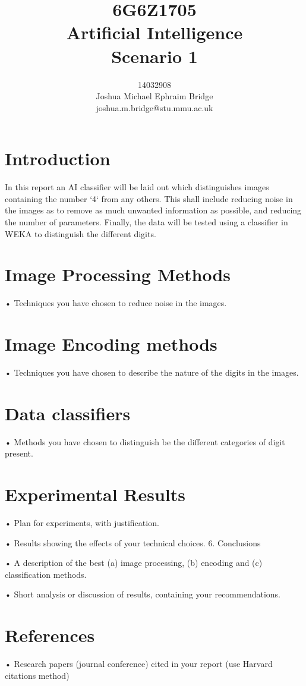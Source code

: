 \documentclass[12pt]{article}
\title{\vspace{2cm}6G6Z1705\\\textbf{Artificial Intelligence}\\\vspace{2cm}Scenario 1\\\vspace{2cm}}
\author{14032908\\Joshua Michael Ephraim Bridge\\joshua.m.bridge@stu.mmu.ac.uk\\\vspace{1cm}}
\begin{document}
\maketitle

\newpage

\doublespacing

\section{Introduction}
In this report an AI classifier will be laid out which distinguishes images containing the number ‘4‘ from any others. This shall include reducing noise in the images as to remove as much unwanted information as possible, and reducing the number of parameters. Finally, the data will be tested using a classifier in WEKA to distinguish the different digits.

\section{Image Processing Methods}
• Techniques you have chosen to reduce noise in the images.

\section{Image Encoding methods}
• Techniques you have chosen to describe the nature of the digits in the images.

\section{Data classifiers}
• Methods you have chosen to distinguish be the different categories of digit present.

\section{Experimental Results}
• Plan for experiments, with justification.

• Results showing the effects of your technical choices. 6. Conclusions

• A description of the best (a) image processing,
(b) encoding and
(c) classification methods.

• Short analysis or discussion of results, containing your recommendations.

\section{References}
• Research papers (journal conference) cited in your report (use Harvard citations method)
\end{document}

